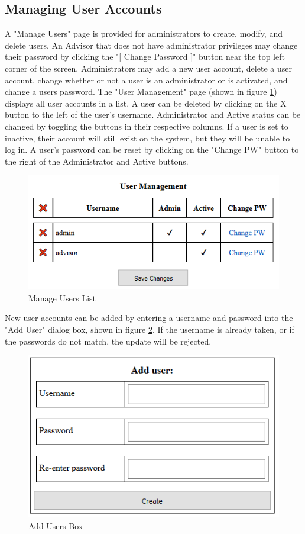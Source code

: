 \documentclass[]{article}
\begin{document}
	\subsection{Managing User Accounts}\label{ssec:14}
		A "Manage Users" page is provided for administrators to create, modify, and delete users. An Advisor that does not have administrator privileges may change their password by clicking the "[ Change Password ]" button near the top left corner of the screen. Administrators may add a new user account, delete a user account, change whether or not a user is an administrator or is activated, and change a users password. The "User Management" page (shown in figure \ref{manageusers}) displays all user accounts in a list. A user can be deleted by clicking on the X button to the left of the user's username. Administrator and Active status can be changed by toggling the buttons in their respective columns. If a user is set to inactive, their account will still exist on the system, but they will be unable to log in. A user's password can be reset by clicking on the "Change PW" button to the right of the Administrator and Active buttons. 
		\begin{figure}[H]
			\caption{Manage Users List}
			\label{manageusers}
			\centering
			\includegraphics[width=\textwidth]{manageusers.PNG}
		\end{figure}
		New user accounts can be added by entering a username and password into the "Add User" dialog box, shown in figure \ref{adduser}. If the username is already taken, or if the passwords do not match, the update will be rejected.
		\begin{figure}[H]
			\caption{Add Users Box}
			\label{adduser}
			\centering
			\includegraphics{adduser.PNG}
		\end{figure}
\end{document}
